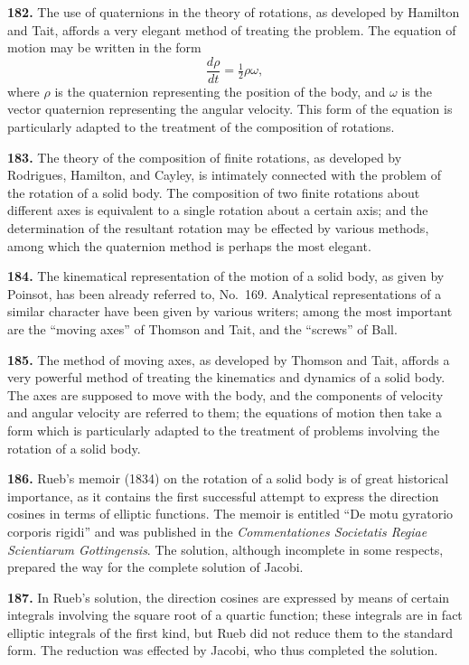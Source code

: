 \documentclass[11pt,a4paper]{book}
\begin{document}
\textbf{182.} The use of quaternions in the theory of rotations, as developed by Hamilton and Tait, affords a very elegant method of treating the problem. The equation of motion may be written in the form
\[
\frac{d\rho}{dt} = \tfrac{1}{2}\rho\omega,
\]
where $\rho$ is the quaternion representing the position of the body, and $\omega$ is the vector quaternion representing the angular velocity. This form of the equation is particularly adapted to the treatment of the composition of rotations.

\textbf{183.} The theory of the composition of finite rotations, as developed by Rodrigues, Hamilton, and Cayley, is intimately connected with the problem of the rotation of a solid body. The composition of two finite rotations about different axes is equivalent to a single rotation about a certain axis; and the determination of the resultant rotation may be effected by various methods, among which the quaternion method is perhaps the most elegant.

\textbf{184.} The kinematical representation of the motion of a solid body, as given by Poinsot, has been already referred to, No.~169. Analytical representations of a similar character have been given by various writers; among the most important are the ``moving axes'' of Thomson and Tait, and the ``screws'' of Ball.

\textbf{185.} The method of moving axes, as developed by Thomson and Tait, affords a very powerful method of treating the kinematics and dynamics of a solid body. The axes are supposed to move with the body, and the components of velocity and angular velocity are referred to them; the equations of motion then take a form which is particularly adapted to the treatment of problems involving the rotation of a solid body.

\textbf{186.} Rueb's memoir (1834) on the rotation of a solid body is of great historical importance, as it contains the first successful attempt to express the direction cosines in terms of elliptic functions. The memoir is entitled ``De motu gyratorio corporis rigidi'' and was published in the \textit{Commentationes Societatis Regiae Scientiarum Gottingensis}. The solution, although incomplete in some respects, prepared the way for the complete solution of Jacobi.

\textbf{187.} In Rueb's solution, the direction cosines are expressed by means of certain integrals involving the square root of a quartic function; these integrals are in fact elliptic integrals of the first kind, but Rueb did not reduce them to the standard form. The reduction was effected by Jacobi, who thus completed the solution.
\end{document}
